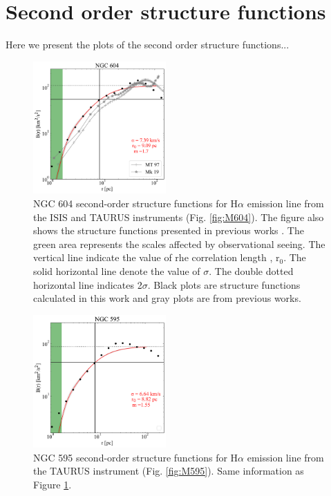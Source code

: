 \documentclass[fleqn,usenatbib, useAMS, a4paper]{mnras}
\begin{document}
\clearpage

\section{Second order structure functions}\label{sec:StructFunct}

Here we present the plots of the second order structure functions...

\begin{figure}
\centering 
\includegraphics[width=2in]{Figures/SFplots/604}
\caption{NGC 604 second-order structure functions for H$\alpha$ emission line from the ISIS and TAURUS instruments (Fig. \ref{fig:M604}).
The figure also shows the structure functions presented in previous works \citep{tanco1997,2019arXiv191203543M}.
The green area represents the scales affected by observational seeing.
The vertical line indicate the value of rhe correlation length , r$_{0}$.
The solid horizontal line denote the value of $\sigma$.
The double dotted horizontal line indicates 2$\sigma$.
Black plots are structure functions calculated in this work and gray plots are from previous works.
}
\label{fig:SF604}
\end{figure}

\begin{figure}
\centering 
\includegraphics[width=2in]{Figures/SFplots/595}
\caption{NGC 595 second-order structure functions for H$\alpha$ emission line from the TAURUS instrument (Fig. \ref{fig:M595}).
Same information as Figure \ref{fig:SF604}.}
\label{fig:SF595}
\end{figure}
\end{document}
